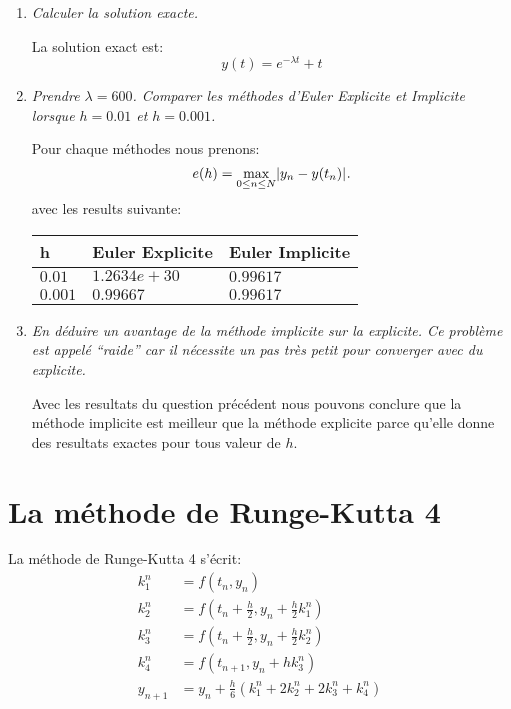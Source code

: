 \documentclass[a4paper,10pt]{article}
\begin{document}
\begin{enumerate}
    \item \emph{Calculer la solution exacte.}

    La solution exact est:
\[
    y(t) = e^{-\lambda t} + t
\]
    \item \emph{Prendre $\lambda = 600$. Comparer les méthodes d'Euler Explicite et
    Implicite lorsque $h = 0.01$ et $h = 0.001$.}

    Pour chaque méthodes nous prenons:
\[
    e(h) = \max_{0 \leq n \leq N} \lvert y_n - y(t_n)\rvert_{}.
\]
avec les results suivante:
\begin{center}
    \begin{tabular}{|l|l|l|}\hline
        h         & Euler Explicite         & Euler Implicite \\\hline
        $0.01$    & $1.2634e+30$            & $0.99617$ \\\hline
        $0.001$   & $0.99667$               & $0.99617$ \\\hline
    \end{tabular}
\end{center}

    \item \emph{En déduire un avantage de la méthode implicite sur la explicite. Ce
    problème est appelé ``raide'' car il nécessite un pas très petit pour
    converger avec du explicite.}

    Avec les resultats du question précédent nous pouvons conclure que la méthode
    implicite est meilleur que la méthode explicite parce qu'elle donne des resultats
    exactes pour tous valeur de $h$.

\end{enumerate}

\section{La méthode de Runge-Kutta 4}

La méthode de Runge-Kutta 4 s'écrit:
\begin{align}\nonumber
    k_1^n & = f(t_n, y_n) \\\nonumber
    k_2^n & = f(t_n + \frac{h}{2}, y_n + \frac{h}{2} k_1^n) \\
    k_3^n & = f(t_n + \frac{h}{2}, y_n + \frac{h}{2} k_2^n) \\\nonumber
    k_4^n & = f(t_{n + 1}, y_n + h k_3^n) \\\nonumber
    y_{n + 1} & = y_n + \frac{h}{6}(k_1^n + 2 k_2^n + 2k_3^n + k_4^n)
\end{align}
\end{document}
